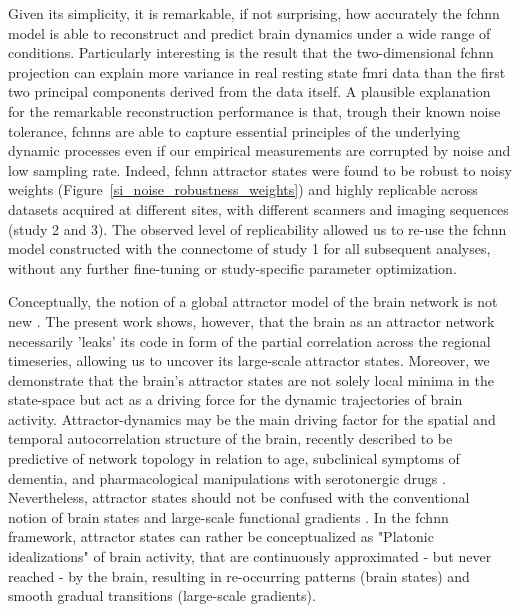 \documentclass{article}
\begin{document}
Given its simplicity, it is remarkable, if not surprising, how accurately the \acrshort{fchnn} model is able to reconstruct and predict brain dynamics under a wide range of conditions. Particularly interesting is the result that the two-dimensional \acrshort{fchnn} projection can explain more variance in real resting state \acrshort{fmri} data than the first two principal components derived from the data itself.
A plausible explanation for the remarkable reconstruction performance is that, trough their known noise tolerance, \acrshort{fchnn}s are able to capture essential principles of the underlying dynamic processes even if our empirical measurements are corrupted by noise and low sampling rate.
Indeed, \acrshort{fchnn} attractor states were found to be robust to noisy weights (Figure~\ref{si_noise_robustness_weights}) and highly replicable across datasets acquired at different sites, with different scanners and imaging sequences (study 2 and 3). The observed level of replicability allowed us to re-use the \acrshort{fchnn} model constructed with the connectome of study 1 for all subsequent analyses, without any further fine-tuning or study-specific parameter optimization.

Conceptually, the notion of a global attractor model of the brain network is not new \citep{deco2012ongoing}. The present work shows, however, that the brain as an attractor network necessarily 'leaks' its code in form of the partial correlation across the regional timeseries, allowing us to uncover its large-scale attractor states. Moreover, we demonstrate that the brain's attractor states are not solely local minima in the state-space but act as a driving force for the dynamic trajectories of brain activity. Attractor-dynamics may be the main driving factor for the spatial and temporal autocorrelation structure of the brain, recently described to be predictive of network topology in relation to age, subclinical symptoms of dementia, and pharmacological manipulations with serotonergic drugs \citep{shinn2023functional}.
Nevertheless, attractor states should not be confused with the conventional notion of brain states \citep{chen2015introducing} and large-scale functional gradients \citep{margulies2016situating}. In the \acrshort{fchnn} framework, attractor states can rather be conceptualized as "Platonic idealizations" of brain activity, that are continuously approximated - but never reached - by the brain, resulting in re-occurring patterns (brain states) and smooth gradual transitions (large-scale gradients).
\end{document}
